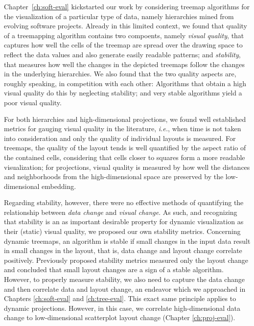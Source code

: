 Chapter~\ref{ch:soft-eval} kickstarted our work by considering treemap algorithms for the visualization of a particular type of data, namely hierarchies mined from evolving software projects. Already in this limited context, we found that quality of a treemapping algorithm contains two compoents, namely \emph{visual quality}, that captures how well the cells of the treemap are spread over the drawing space to reflect the data values and also generate easily readable patterns; and \emph{stability}, that measures how well the changes in the depicted treemaps follow the changes in the underlying hierarchies. We also found that the two quality aspects are, roughly speaking, in competition with each other: Algorithms that obtain a high visual quality do this by neglecting stability; and very stable algorithms yield a poor visual quality.

For both hierarchies and high-dimensional projections, we found well established metrics for gauging visual quality in the literature, \emph{i.e.}, when time is not taken into consideration and only the quality of individual layouts is measured. For treemaps, the quality of the layout tends is well quantified by the aspect ratio of the contained cells, considering that cells closer to squares form a more readable visualization; for projections, visual quality is measured by how well the distances and neighborhoods from the high-dimensional space are preserved by the low-dimensional embedding.

Regarding stability, however, there were no effective methods of quantifying the relationship between \emph{data change} and \emph{visual change}. As such, and recognizing that stability is an as important desirable property for dynamic visualization as their (static) visual quality, we proposed our own stability metrics. Concerning dynamic treemaps, an algorithm is stable if small changes in the input data result in small changes in the layout, that is, data change and layout change correlate positively. Previously proposed stability metrics measured only the layout change and concluded that small layout changes are a sign of a stable algorithm. However, to properly measure stability, we also need to capture the data change and then correlate data and layout change, an endeavor which we approached in Chapters \ref{ch:soft-eval} and \ref{ch:tree-eval}. This exact same principle applies to dynamic projections. However, in this case, we correlate high-dimensional data change to low-dimensional scatterplot layout change (Chapter \ref{ch:proj-eval}).  

